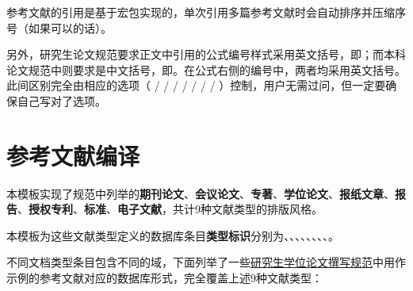 \documentclass[print, doctor, vlined]{DissertUESTC}
\begin{document}
	参考文献的引用是基于宏包实现的，单次引用多篇参考文献时会自动排序并压缩序号（如果可以的话）。

	另外，研究生论文规范要求正文中引用的公式编号样式采用英文括号，即；而本科论文规范中则要求是中文括号，即。在公式右侧的编号中，两者均采用英文括号。此间区别完全由相应的选项（ /  /  /  /  /  /  / ）控制，用户无需过问，但一定要确保自己写对了选项。
	
	
	\section{参考文献编译}
	
	本模板实现了规范中列举的\textbf{期刊论文}、\textbf{会议论文}、\textbf{专著}、\textbf{学位论文}、\textbf{报纸文章}、\textbf{报告}、\textbf{授权专利}、\textbf{标准}、\textbf{电子文献}，共计9种文献类型的排版风格。
	
	本模板为这些文献类型定义的数据库条目\textbf{类型标识}分别为、、、、、、、、。
	
	不同文档类型条目包含不同的域，下面列举了一些\href{https://gr.uestc.edu.cn/xiazai/114/3917}{研究生学位论文撰写规范}中用作示例的参考文献对应的数据库形式，完全覆盖上述9种文献类型：
	
\end{document}
